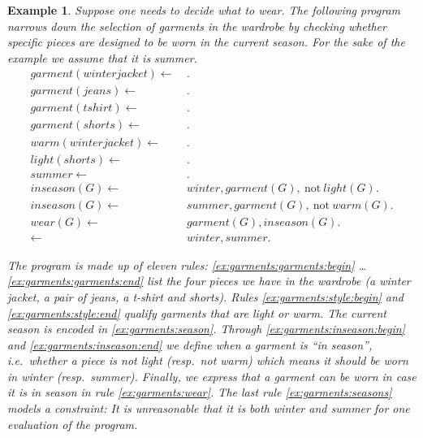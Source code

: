 \documentclass{vutinfth} %
\newtheorem{example}{Example}[chapter]
\newcommand{\fail}{\mathrm{not } \ \xspace}
\newcommand{\from}{\ensuremath{\leftarrow}}
\begin{document}
\begin{example}
\label{ex:garments}
Suppose one needs to decide what to wear. The following program narrows down the selection of garments in the wardrobe by checking whether specific pieces are designed to be worn in the current season. For the sake of the example we assume that it is summer.
\begin{align}
garment(winterjacket)\from& \ .\tag{$f_1$}\label{ex:garments:garments:begin}\\
garment(jeans)\from& \ .\tag{$f_2$}\\
garment(tshirt)\from& \ .\tag{$f_3$}\\
garment(shorts)\from& \ .\tag{$f_4$}\label{ex:garments:garments:end}\\
warm(winterjacket)\from& \ .\tag{$f_5$}\label{ex:garments:style:begin}\\
light(shorts)\from& \ .\tag{$f_6$}\label{ex:garments:style:end}\\
summer\from& \ .\tag{$f_7$}\label{ex:garments:season}\\
inseason(G) \from& \ winter, garment(G),~\fail light(G). \tag{$r_1$}\label{ex:garments:inseason:begin}\\
inseason(G) \from& \ summer, garment(G),~\fail warm(G). \tag{$r_2$}\label{ex:garments:inseason:end}\\
wear(G) \from& \ garment(G), inseason(G). \tag{$r_3$}\label{ex:garments:wear}\\
\from& \ winter, summer. \tag{$c_1$}\label{ex:garments:seasons}
\end{align}

The program is made up of eleven rules: \ref{ex:garments:garments:begin} \ldots \ref{ex:garments:garments:end} list the four pieces we have in the wardrobe (a winter jacket, a pair of jeans, a t-shirt and shorts). Rules \ref{ex:garments:style:begin} and \ref{ex:garments:style:end} qualify garments that are light or warm. The current season is encoded in \ref{ex:garments:season}. Through \ref{ex:garments:inseason:begin} and \ref{ex:garments:inseason:end} we define when a garment is \enquote{in season}, i.e.~whether a piece is not light (resp.~not warm) which means it should be worn in winter (resp.~summer). Finally, we express that a garment can be worn in case it is in season in rule \ref{ex:garments:wear}. The last rule \ref{ex:garments:seasons} models a constraint: It is unreasonable that it is both winter and summer for one evaluation of the program.
\end{example}
\end{document}
